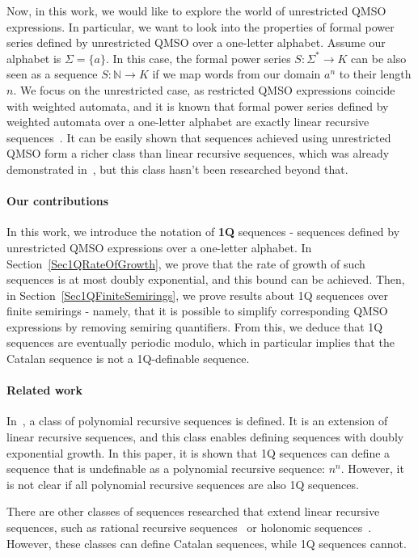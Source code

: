 \documentclass[12pt]{article}
\theoremstyle{definition}
\begin{document}
Now, in this work, we would like to explore the world of unrestricted QMSO expressions. In particular, we want to look into the properties of formal power series defined by unrestricted QMSO over a one-letter alphabet. Assume our alphabet is $\Sigma = \{a\}$. In this case, the formal power series $S: \Sigma^* \rightarrow K$ can be also seen as a sequence $S: \mathbb{N} \rightarrow K$ if we map words from our domain $a^n$ to their length $n$. We focus on the unrestricted case, as restricted QMSO expressions coincide with weighted automata, and it is known that formal power series defined by weighted automata over a one-letter alphabet are exactly linear recursive sequences~\cite{BarloyFLM22}. It can be easily shown that sequences achieved using unrestricted QMSO form a richer class than linear recursive sequences, which was already demonstrated in~\cite{CadilhacMPPS20}, but this class hasn't been researched beyond that.

\paragraph*{Our contributions}
In this work, we introduce the notation of \textbf{1Q} sequences - sequences defined by unrestricted QMSO expressions over a one-letter alphabet. In Section~\ref{Sec1QRateOfGrowth}, we prove that the rate of growth of such sequences is at most doubly exponential, and this bound can be achieved. Then, in Section~\ref{Sec1QFiniteSemirings}, we prove results about 1Q sequences over finite semirings - namely, that it is possible to simplify corresponding QMSO expressions by removing semiring quantifiers. From this, we deduce that 1Q sequences are eventually periodic modulo, which in particular implies that the Catalan sequence is not a 1Q-definable sequence.

\paragraph*{Related work}
In~\cite{CadilhacMPPS20}, a class of polynomial recursive sequences is defined. It is an extension of linear recursive sequences, and this class enables defining sequences with doubly exponential growth. In this paper, it is shown that 1Q sequences can define a sequence that is undefinable as a polynomial recursive sequence: $n^n$. However, it is not clear if all polynomial recursive sequences are also 1Q sequences.

There are other classes of sequences researched that extend linear recursive sequences, such as rational recursive sequences~\cite{ClementeDMP23} or holonomic sequences~\cite{KenisonKLLMOW021}. However, these classes can define Catalan sequences, while 1Q sequences cannot.
\end{document}
